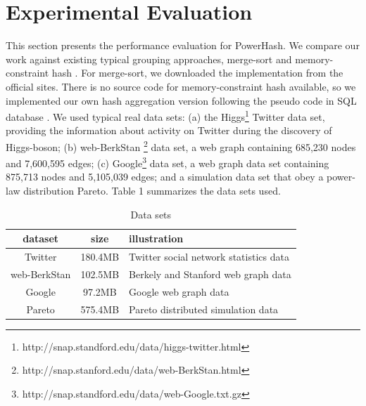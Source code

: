 \section{Experimental Evaluation}
\label{sec:experiment}

This section presents the performance evaluation for PowerHash. We compare our work against existing typical grouping approaches, merge-sort \cite{dean2008mapreduce} and memory-constraint hash \cite{bartholomew2012mariadb}. For merge-sort, we downloaded the implementation from the official sites. There is no source code for memory-constraint hash available, so we implemented our own hash aggregation version following the pseudo code in SQL database \cite{HashAggregate15}. We used typical real data sets:  (a) the Higgs\footnote{http://snap.standford.edu/data/higgs-twitter.html} Twitter data set, providing the information about activity on Twitter during the discovery of Higgs-boson; (b) web-BerkStan \footnote{http://snap.stanford.edu/data/web-BerkStan.html} data set, a web graph containing 685,230 nodes and 7,600,595 edges;  (c) Google\footnote{http://snap.standford.edu/data/web-Google.txt.gz} data set, a web graph data set containing 875,713 nodes and 5,105,039 edges; and a simulation data set that obey a power-law distribution Pareto. Table 1 summarizes the data sets used.

\begin{table}[h]
  \caption{Data sets}
  \label{tab:dataset}
  \begin{tabular}{ccl}
    \toprule
    dataset &size & illustration\\
    \midrule
    Twitter & 180.4MB& Twitter social network statistics data\\
	web-BerkStan & 102.5MB& Berkely and Stanford web graph data\\
    Google & 97.2MB & Google web graph data\\
    Pareto & 575.4MB & Pareto distributed simulation data\\
    \bottomrule
  \end{tabular}
\end{table}

